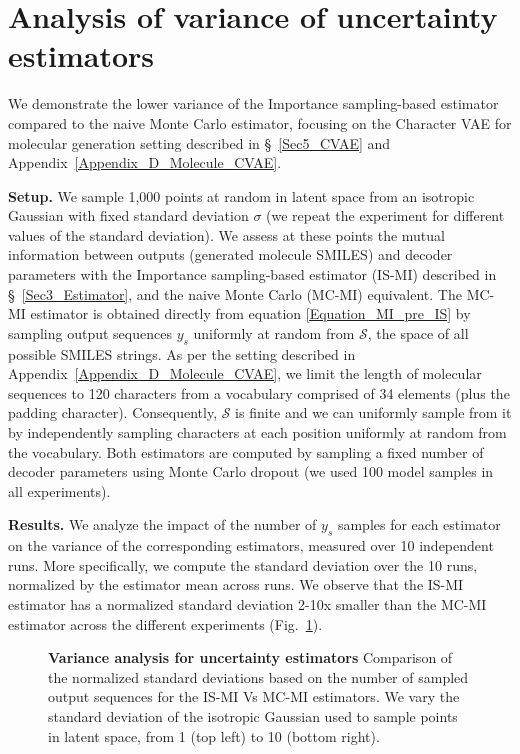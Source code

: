 \section{Analysis of variance of uncertainty estimators}
\label{Appendix_Uncertainty_estimator}

We demonstrate the lower variance of the Importance sampling-based estimator compared to the naive Monte Carlo estimator, focusing on the Character VAE for molecular generation setting described in \S~\ref{Sec5_CVAE} and Appendix~\ref{Appendix_D_Molecule_CVAE}.

\textbf{Setup.} We sample 1,000 points at random in latent space from an isotropic Gaussian with fixed standard deviation $\sigma$ (we repeat the experiment for different values of the standard deviation). We assess at these points the mutual information between outputs (generated molecule SMILES) and decoder parameters with the Importance sampling-based estimator (IS-MI) described in \S~\ref{Sec3_Estimator}, and the naive Monte Carlo (MC-MI) equivalent. The MC-MI estimator is obtained directly from equation \ref{Equation_MI_pre_IS} by sampling output sequences $y_s$ uniformly at random from  $\mathcal{S}$, the space of all possible SMILES strings. As per the setting described in Appendix~\ref{Appendix_D_Molecule_CVAE}, we limit the length of molecular sequences to 120 characters from a vocabulary comprised of 34 elements (plus the padding character). Consequently, $\mathcal{S}$ is finite and we can uniformly sample from it by independently sampling characters at each position uniformly at random from the vocabulary.
Both estimators are computed by sampling a fixed number of decoder parameters using Monte Carlo dropout \cite{gal2016dropout} (we used 100 model samples in all experiments).

\textbf{Results.} We analyze the impact of the number of $y_s$ samples for each estimator on the variance of the corresponding estimators, measured over 10 independent runs. More specifically, we compute the standard deviation over the 10 runs, normalized by the estimator mean across runs. We observe that the IS-MI estimator has a normalized standard deviation 2-10x smaller than the MC-MI estimator across the different experiments (Fig.~\ref{Appendix_Fig_variance_analysis_results}).

\begin{figure}[ht]
\vspace{0pt}
\hfill
{}
\caption{\textbf{Variance analysis for uncertainty estimators} Comparison of the normalized standard deviations based on the number of sampled output sequences for the IS-MI Vs MC-MI estimators. We vary the standard deviation of the isotropic Gaussian used to sample points in latent space, from 1 (top left) to 10 (bottom right).}
\label{Appendix_Fig_variance_analysis_results}
\end{figure}



